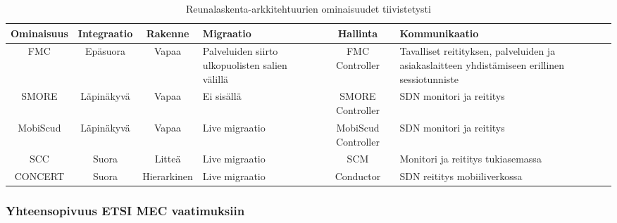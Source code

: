 \begin{landscape}
    \noindent
\begin{table}[!ht]
\caption{Reunalaskenta-arkkitehtuurien ominaisuudet tiivistetysti}
\label{table:features}
\begin{tabularx}{ \linewidth }{ | c | c | c | p{3cm} | c | p{5cm} | }
\hline 
 \textbf{Ominaisuus} & \textbf{Integraatio} & \textbf{Rakenne} & \textbf{Migraatio} & \textbf{Hallinta} & \textbf{Kommunikaatio} \\ 
\hline 
 FMC & Epäsuora & Vapaa & Palveluiden siirto ulkopuolisten salien välillä & FMC Controller & Tavalliset reitityksen, palveluiden ja asiakaslaitteen yhdistämiseen erillinen sessiotunniste \\ 
\hline 
 SMORE & Läpinäkyvä & Vapaa & Ei sisällä & SMORE Controller & SDN monitori ja reititys \\ 
\hline 
MobiScud & Läpinäkyvä & Vapaa & Live migraatio & MobiScud Controller & SDN monitori ja reititys\\ 
\hline 
SCC & Suora & Litteä & Live migraatio & SCM & Monitori ja reititys tukiasemassa \\ 
\hline 
CONCERT & Suora & Hierarkinen & Live migraatio & Conductor & SDN reititys mobiiliverkossa \\ 
\hline 
\end{tabularx} 
\end{table}
\end{landscape}

\subsubsection{Yhteensopivuus ETSI MEC vaatimuksiin}



